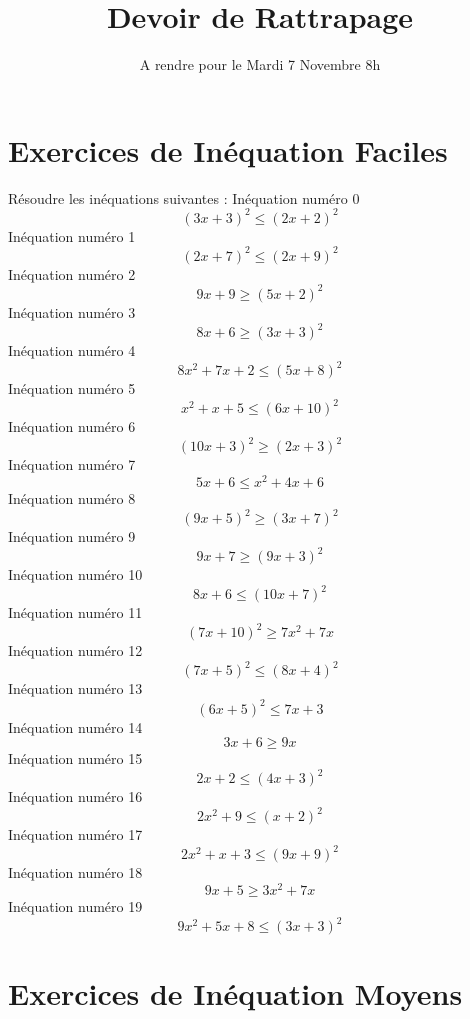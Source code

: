 \documentclass{article}
\title{Devoir de Rattrapage}
\date{A rendre pour le Mardi 7 Novembre 8h}\usepackage{natbib}
\begin{document}
\maketitle
 \section{Exercices de In\'equation Faciles}

 R\'esoudre les in\'equations suivantes : 
In\'equation num\'ero 0 \[\left(3 x + 3\right)^{2} \leq \left(2 x + 2\right)^{2}\]In\'equation num\'ero 1 \[\left(2 x + 7\right)^{2} \leq \left(2 x + 9\right)^{2}\]In\'equation num\'ero 2 \[9 x + 9 \geq \left(5 x + 2\right)^{2}\]In\'equation num\'ero 3 \[8 x + 6 \geq \left(3 x + 3\right)^{2}\]In\'equation num\'ero 4 \[8 x^{2} + 7 x + 2 \leq \left(5 x + 8\right)^{2}\]In\'equation num\'ero 5 \[x^{2} + x + 5 \leq \left(6 x + 10\right)^{2}\]In\'equation num\'ero 6 \[\left(10 x + 3\right)^{2} \geq \left(2 x + 3\right)^{2}\]In\'equation num\'ero 7 \[5 x + 6 \leq x^{2} + 4 x + 6\]In\'equation num\'ero 8 \[\left(9 x + 5\right)^{2} \geq \left(3 x + 7\right)^{2}\]In\'equation num\'ero 9 \[9 x + 7 \geq \left(9 x + 3\right)^{2}\]In\'equation num\'ero 10 \[8 x + 6 \leq \left(10 x + 7\right)^{2}\]In\'equation num\'ero 11 \[\left(7 x + 10\right)^{2} \geq 7 x^{2} + 7 x\]In\'equation num\'ero 12 \[\left(7 x + 5\right)^{2} \leq \left(8 x + 4\right)^{2}\]In\'equation num\'ero 13 \[\left(6 x + 5\right)^{2} \leq 7 x + 3\]In\'equation num\'ero 14 \[3 x + 6 \geq 9 x\]In\'equation num\'ero 15 \[2 x + 2 \leq \left(4 x + 3\right)^{2}\]In\'equation num\'ero 16 \[2 x^{2} + 9 \leq \left(x + 2\right)^{2}\]In\'equation num\'ero 17 \[2 x^{2} + x + 3 \leq \left(9 x + 9\right)^{2}\]In\'equation num\'ero 18 \[9 x + 5 \geq 3 x^{2} + 7 x\]In\'equation num\'ero 19 \[9 x^{2} + 5 x + 8 \leq \left(3 x + 3\right)^{2}\]
 \section{Exercices de In\'equation Moyens}
\end{document}
